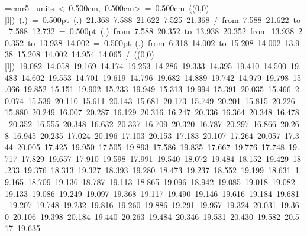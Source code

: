 \font\thinlinefont=cmr5
\mbox{\beginpicture
\setcoordinatesystem units < 0.500cm, 0.500cm>
\unitlength= 0.500cm
\linethickness=1pt
\setplotsymbol ({\makebox(0,0)[l]{\tencirc{}}})
\setshadesymbol ({\thinlinefont .})
\setlinear
%
%
\linethickness= 0.500pt
\setplotsymbol ({\thinlinefont .})
%
%
 21.368  7.588 21.622  7.525 21.368 /
%
\putrule from  7.588 21.622 to  7.588 12.732
%
%
\linethickness= 0.500pt
\setplotsymbol ({\thinlinefont .})
\putrule from  7.588 20.352 to 13.938 20.352
\putrule from 13.938 20.352 to 13.938 14.002
%
%
\linethickness= 0.500pt
\setplotsymbol ({\thinlinefont .})
\putrule from  6.318 14.002 to 15.208 14.002
%
%
 13.938 15.208 14.002 14.954 14.065 /
%
\linethickness=1pt
\setplotsymbol ({\makebox(0,0)[l]{\tencirc{}}})
%
%
 19.082     14.058 19.169
        14.174 19.253
        14.286 19.333
        14.395 19.410
        14.500 19.483
        14.602 19.553
        14.701 19.619
        14.796 19.682
        14.889 19.742
        14.979 19.798
        15.066 19.852
        15.151 19.902
        15.233 19.949
        15.313 19.994
        15.391 20.035
        15.466 20.074
        15.539 20.110
        15.611 20.143
        15.681 20.173
        15.749 20.201
        15.815 20.226
        15.880 20.249
        16.007 20.287
        16.129 20.316
        16.247 20.336
        16.364 20.348
        16.478 20.352
        16.555 20.348
        16.632 20.337
        16.709 20.320
        16.787 20.297
        16.866 20.268
        16.945 20.235
        17.024 20.196
        17.103 20.153
        17.183 20.107
        17.264 20.057
        17.344 20.005
        17.425 19.950
        17.505 19.893
        17.586 19.835
        17.667 19.776
        17.748 19.717
        17.829 19.657
        17.910 19.598
        17.991 19.540
        18.072 19.484
        18.152 19.429
        18.233 19.376
        18.313 19.327
        18.393 19.280
        18.473 19.237
        18.552 19.199
        18.631 19.165
        18.709 19.136
        18.787 19.113
        18.865 19.096
        18.942 19.085
        19.018 19.082
        19.133 19.086
        19.249 19.097
        19.368 19.117
        19.490 19.146
        19.616 19.184
        19.681 19.207
        19.748 19.232
        19.816 19.260
        19.886 19.291
        19.957 19.324
        20.031 19.360
        20.106 19.398
        20.184 19.440
        20.263 19.484
        20.346 19.531
        20.430 19.582
        20.517 19.635
}
